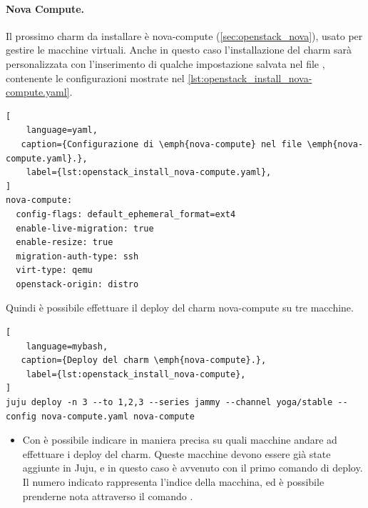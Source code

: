\paragraph{Nova Compute.}
Il prossimo charm da installare è nova-compute (\cref{sec:openstack_nova}), usato per gestire le macchine virtuali.
% 
Anche in questo caso l'installazione del charm sarà personalizzata con l'inserimento di qualche impostazione salvata nel file , contenente le configurazioni mostrate nel \cref{lst:openstack_install_nova-compute.yaml}.
\begin{lstlisting}[
    language=yaml, 
   caption={Configurazione di \emph{nova-compute} nel file \emph{nova-compute.yaml}.},
    label={lst:openstack_install_nova-compute.yaml},
]
nova-compute:
  config-flags: default_ephemeral_format=ext4
  enable-live-migration: true
  enable-resize: true
  migration-auth-type: ssh
  virt-type: qemu
  openstack-origin: distro
\end{lstlisting}

\bigskip\noindent
Quindi è possibile effettuare il deploy del charm nova-compute su tre macchine.
\begin{lstlisting}[
    language=mybash, 
   caption={Deploy del charm \emph{nova-compute}.},
    label={lst:openstack_install_nova-compute},
]
juju deploy -n 3 --to 1,2,3 --series jammy --channel yoga/stable --config nova-compute.yaml nova-compute
\end{lstlisting}
\begin{itemize}
    \item Con  è possibile indicare in maniera precisa su quali macchine andare ad effettuare i deploy del charm.
    Queste macchine devono essere già state aggiunte in Juju, e in questo caso è avvenuto con il primo comando di deploy.
    Il numero indicato rappresenta l'indice della macchina, ed è possibile prenderne nota attraverso il comando .   
\end{itemize}


